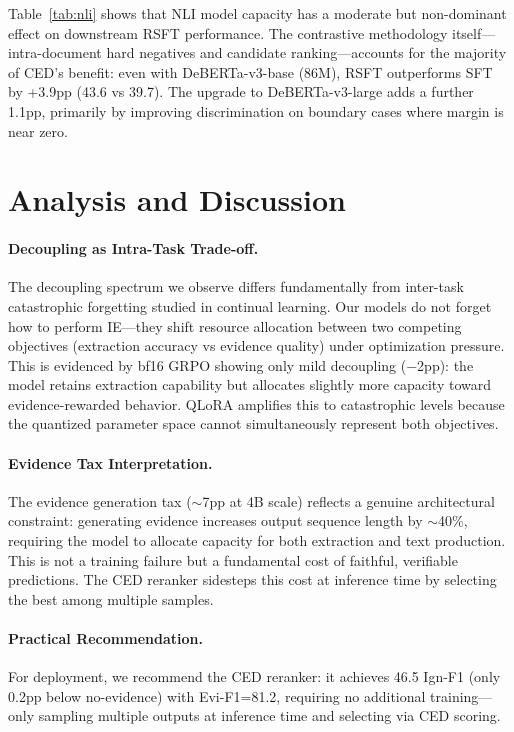 \documentclass[11pt]{article}
\begin{document}
Table~\ref{tab:nli} shows that NLI model capacity has a moderate but non-dominant effect on downstream RSFT performance. The contrastive methodology itself---intra-document hard negatives and candidate ranking---accounts for the majority of CED's benefit: even with DeBERTa-v3-base (86M), RSFT outperforms SFT by +3.9pp (43.6 vs 39.7). The upgrade to DeBERTa-v3-large adds a further 1.1pp, primarily by improving discrimination on boundary cases where margin is near zero.

\section{Analysis and Discussion}

\paragraph{Decoupling as Intra-Task Trade-off.}
The decoupling spectrum we observe differs fundamentally from inter-task catastrophic forgetting studied in continual learning. Our models do not forget how to perform IE---they shift resource allocation between two competing objectives (extraction accuracy vs evidence quality) under optimization pressure. This is evidenced by bf16 GRPO showing only mild decoupling ($-$2pp): the model retains extraction capability but allocates slightly more capacity toward evidence-rewarded behavior. QLoRA amplifies this to catastrophic levels because the quantized parameter space cannot simultaneously represent both objectives.

\paragraph{Evidence Tax Interpretation.}
The evidence generation tax ($\sim$7pp at 4B scale) reflects a genuine architectural constraint: generating evidence increases output sequence length by $\sim$40\%, requiring the model to allocate capacity for both extraction and text production. This is not a training failure but a fundamental cost of faithful, verifiable predictions. The CED reranker sidesteps this cost at inference time by selecting the best among multiple samples.

\paragraph{Practical Recommendation.}
For deployment, we recommend the CED reranker: it achieves 46.5 Ign-F1 (only 0.2pp below no-evidence) with Evi-F1=81.2, requiring no additional training---only sampling multiple outputs at inference time and selecting via CED scoring.
\end{document}
